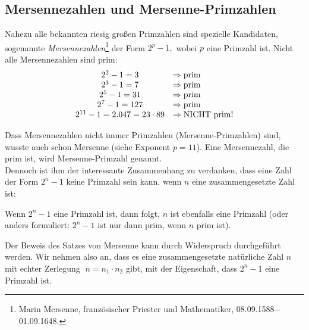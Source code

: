 \begin{refsegment}


\hypertarget{MersenneNumbers01}{}
\subsection{Mersennezahlen und Mersenne-Primzahlen}
\label{zahlentyp_mersenne}

Nahezu alle bekannten riesig großen Primzahlen sind spezielle
Kandidaten, sogenannte {\em Mersennezahlen}\footnote{%
Marin Mersenne, französischer Priester und Mathematiker,
08.09.1588$-$01.09.1648.
}
der Form $2^p -1,$ wobei $p$ eine Primzahl ist.
Nicht alle Mersennezahlen sind prim:
$$
\begin{array}{cl}
2^2 - 1 = 3 & \Rightarrow {\rm prim} \\
2^3 - 1 = 7 & \Rightarrow {\rm prim} \\
2^5 - 1 = 31    & \Rightarrow {\rm prim} \\
2^7 - 1 = 127    & \Rightarrow {\rm prim} \\
2^{11} - 1 = 2.047 = 23 \cdot 89    & \Rightarrow  {\rm NICHT~prim} !
\end{array}
$$


Dass Mersennezahlen nicht immer Primzahlen (Mersenne-Primzahlen) sind,
wusste auch schon Mersenne (siehe Exponent $p = 11$).
Eine Mersennezahl, die prim ist, wird Mersenne-Primzahl
 genannt.  \\

Dennoch ist ihm der interessante Zusammenhang zu verdanken, dass eine
Zahl der Form $2^n-1$ keine Primzahl sein kann, wenn $n$ eine
zusammengesetzte Zahl ist:

\begin{satz}[Mersenne]\label{thm-pz-mersenne}
  Wenn $2^n - 1$ eine Primzahl ist, dann folgt, $n$ ist ebenfalls eine
  Primzahl (oder anders formuliert: $2^n - 1$ ist nur dann prim,
  wenn $n$ prim ist).
\end{satz}

\begin{Beweis}{}
Der Beweis des Satzes von Mersenne kann durch Widerspruch
durchgeführt werden. Wir nehmen also an, dass es eine
zusammengesetzte natürliche Zahl $ n $ mit echter Zerlegung
$\; n=n_1 \cdot n_2 $
gibt, mit der Eigenschaft, dass $ 2^n -1 $ eine
Primzahl ist.


\end{Beweis}
\end{refsegment}
